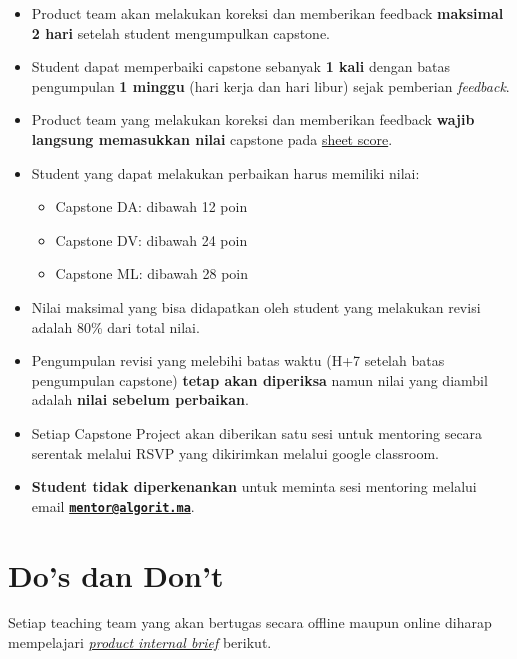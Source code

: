 \documentclass[
]{book}
\providecommand{\tightlist}{%
  \setlength{\itemsep}{0pt}\setlength{\parskip}{0pt}}
\begin{document}
\begin{itemize}
\item
  Product team akan melakukan koreksi dan memberikan feedback \textbf{maksimal 2 hari} setelah student mengumpulkan capstone.
\item
  Student dapat memperbaiki capstone sebanyak \textbf{1 kali} dengan batas pengumpulan \textbf{1 minggu} (hari kerja dan hari libur) sejak pemberian \emph{feedback}.
\item
  Product team yang melakukan koreksi dan memberikan feedback \textbf{wajib langsung memasukkan nilai} capstone pada \href{https://docs.google.com/spreadsheets/d/1cGJ0pn9k9gKCBnceWVwaL9D7BBDMNjLh8uPYlaBlJi8/edit?usp=sharing}{sheet score}.
\item
  Student yang dapat melakukan perbaikan harus memiliki nilai:

  \begin{itemize}
  \tightlist
  \item
    Capstone DA: dibawah 12 poin
  \item
    Capstone DV: dibawah 24 poin
  \item
    Capstone ML: dibawah 28 poin
  \end{itemize}
\item
  Nilai maksimal yang bisa didapatkan oleh student yang melakukan revisi adalah 80\% dari total nilai.
\item
  Pengumpulan revisi yang melebihi batas waktu (H+7 setelah batas pengumpulan capstone) \textbf{tetap akan diperiksa} namun nilai yang diambil adalah \textbf{nilai sebelum perbaikan}.
\item
  Setiap Capstone Project akan diberikan satu sesi untuk mentoring secara serentak melalui RSVP yang dikirimkan melalui google classroom.
\item
  \textbf{Student tidak diperkenankan} untuk meminta sesi mentoring melalui email \textbf{\href{mailto:mentor@algorit.ma}{\nolinkurl{mentor@algorit.ma}}}.
\end{itemize}

\hypertarget{dos-dan-dont}{%
\chapter{Do's dan Don't}\label{dos-dan-dont}}

Setiap teaching team yang akan bertugas secara offline maupun online diharap mempelajari \href{https://docs.google.com/presentation/d/17f0z3x9RhJCjarY1yY3vWyW23kr-gSHHhTNdtd97BnM/edit?usp=sharing}{\emph{product internal brief}} berikut.
\end{document}
